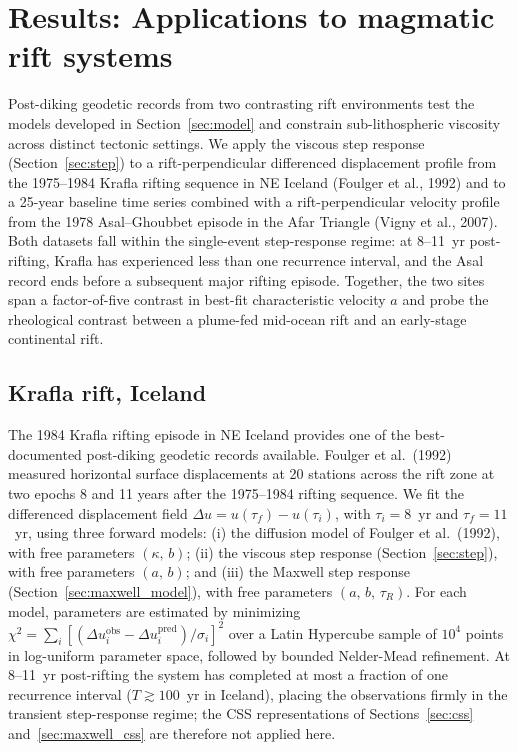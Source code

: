\documentclass[12pt]{article}
\begin{document}
\section{Results: Applications to magmatic rift systems}
\label{sec:results}

Post-diking geodetic records from two contrasting rift environments test the
models developed in Section~\ref{sec:model} and constrain sub-lithospheric
viscosity across distinct tectonic settings.  We apply the viscous step
response (Section~\ref{sec:step}) to a rift-perpendicular differenced
displacement profile from the 1975--1984 Krafla rifting sequence in NE
Iceland (Foulger et al., 1992) and to a 25-year baseline time series
combined with a rift-perpendicular velocity profile from the 1978
Asal--Ghoubbet episode in the Afar Triangle (Vigny et al., 2007).
Both datasets fall within the single-event step-response regime: at
8--11~yr post-rifting, Krafla has experienced less than one recurrence
interval, and the Asal record ends before a subsequent major rifting
episode.  Together, the two sites span a factor-of-five contrast in
best-fit characteristic velocity $a$ and probe the rheological contrast
between a plume-fed mid-ocean rift and an early-stage continental rift.

\subsection{Krafla rift, Iceland}
\label{sec:krafla}

The 1984 Krafla rifting episode in NE Iceland provides one of the
best-documented post-diking geodetic records available.  Foulger et al.\
(1992) measured horizontal surface displacements at 20 stations across
the rift zone at two epochs 8 and 11 years after the 1975--1984 rifting
sequence.  We fit the differenced displacement field
$\Delta u = u(\tau_f) - u(\tau_i)$, with $\tau_i = 8$~yr and
$\tau_f = 11$~yr, using three forward models: (i) the diffusion model
of Foulger et al.\ (1992), with free parameters $(\kappa,\,b)$;
(ii) the viscous step response (Section~\ref{sec:step}), with free
parameters $(a,\,b)$; and (iii) the Maxwell step response
(Section~\ref{sec:maxwell_model}), with free parameters
$(a,\,b,\,\tau_R)$.  For each model, parameters are estimated by
minimizing $\chi^2 = \sum_i [(\Delta u_i^{\text{obs}} -
\Delta u_i^{\text{pred}})/\sigma_i]^2$ over a Latin Hypercube sample of
$10^4$ points in log-uniform parameter space, followed by bounded
Nelder-Mead refinement.  At 8--11~yr post-rifting the system has completed
at most a fraction of one recurrence interval ($T \gtrsim 100$~yr in
Iceland), placing the observations firmly in the transient step-response
regime; the CSS representations of Sections~\ref{sec:css}
and~\ref{sec:maxwell_css} are therefore not applied here.
\end{document}
